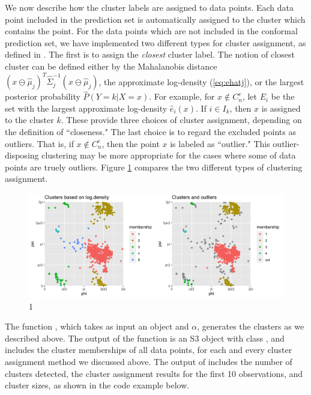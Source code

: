 We now describe how the cluster labels are assigned to data points. Each data point included in the prediction set is automatically assigned to the cluster which contains the point. For the data points which are not included in the conformal prediction set, we have implemented two different types for cluster assignment, as defined in \citet{Jung:2021}.
 The first is to assign the \emph{closest} cluster label. The notion of closest cluster can be defined either by the Mahalanobis distance $(x\ominus\hat\mu_j)^T\hat\Sigma_j^{-1}(x\ominus\hat\mu_j)$,  the approximate log-density (\ref{eq:ehatj}), or the largest posterior probability $\hat{P}(Y = k | X = x)$. For example, for $x\not\in C^e_n$, let $E_i$ be the set with the largest approximate log-density $\hat{e}_i(x)$. If $i\in I_k$, then $x$ is assigned to the cluster $k$. These provide three choices of cluster assignment,  depending on the definition of ``closeness." 
The last choice is to regard the excluded points as outliers.  That is, if $x\not\in C^e_n$, then the point $x$ is labeled as ``outlier." This outlier-disposing clustering may be more appropriate for the cases where some of data points are truely outliers. Figure \ref{fig:mahal} compares the two different types of clustering assignment.

\begin{figure}
     \centering
     \includegraphics[scale = 0.13]{mahal.png}
     \caption{1 }
     \label{fig:mahal}
\end{figure}

The function , which takes as input an  object and  $\alpha$, generates the clusters as we described above. The output of the function is an S3 object with class , and includes the cluster memberships of all data points, for each and every cluster assignment method we discussed above. 
The output of  includes the number of clusters detected, the cluster assignment results for the first 10 observations, and cluster sizes, as shown in the code example below.

